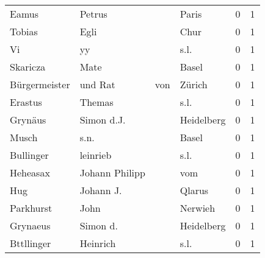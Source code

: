 \begin{tabular}{llllrr}
                    Eamus &                             Petrus &             &                                       Paris &          0 &         1 \\
                   Tobias &                               Egli &             &                                        Chur &          0 &         1 \\
                       Vi &                                 yy &             &                                        s.l. &          0 &         1 \\
                 Skaricza &                               Mate &             &                                       Basel &          0 &         1 \\
            Bürgermeister &                            und Rat &         von &                                      Zürich &          0 &         1 \\
                  Erastus &                             Themas &             &                                        s.l. &          0 &         1 \\
                  Grynäus &                         Simon d.J. &             &                                  Heidelberg &          0 &         1 \\
                    Musch &                               s.n. &             &                                       Basel &          0 &         1 \\
                Bullinger &                           leinrieb &             &                                        s.l. &          0 &         1 \\
                 Heheasax &                     Johann Philipp &             &                                         vom &          0 &         1 \\
                      Hug &                          Johann J. &             &                                      Qlarus &          0 &         1 \\
                Parkhurst &                               John &             &                                     Nerwieh &          0 &         1 \\
                 Grynaeus &                           Simon d. &             &                                  Heidelberg &          0 &         1 \\
               Bttllinger &                           Heinrich &             &                                        s.l. &          0 &         1 \\

\end{tabular}
